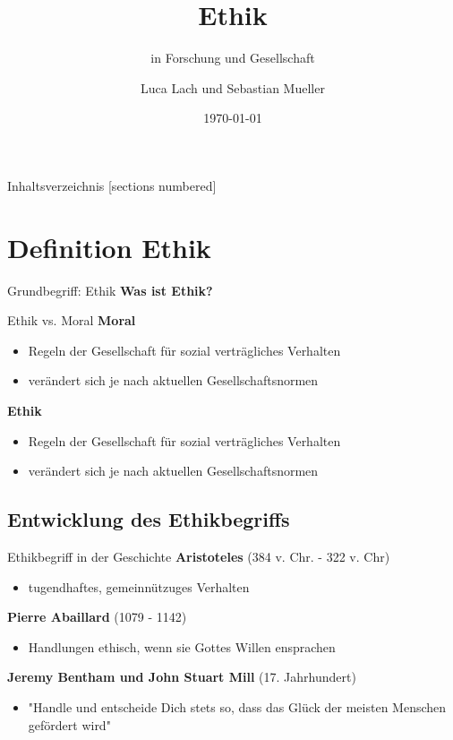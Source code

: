 \documentclass[10pt]{beamer}
\title{Ethik}
\subtitle{in Forschung und Gesellschaft}
\date{\today}
\author{Luca Lach und Sebastian Mueller}
\institute{}
\begin{document}
		
	\maketitle
	
	\begin{frame}{Inhaltsverzeichnis}
		[sections numbered]
		\tableofcontents[hideallsubsections]
	\end{frame}
	
\section{Definition Ethik}
	\begin{frame}{Grundbegriff: Ethik}
		\textbf{Was ist Ethik?}
	\end{frame}
	
	\begin{frame}{Ethik vs. Moral}
		\textbf{Moral}
			\begin{itemize}
				\item Regeln der Gesellschaft für sozial verträgliches Verhalten
				\item verändert sich je nach aktuellen Gesellschaftsnormen
			\end{itemize}
		\textbf{Ethik}
		\begin{itemize}
			\item Regeln der Gesellschaft für sozial verträgliches Verhalten
			\item verändert sich je nach aktuellen Gesellschaftsnormen
		\end{itemize}
			
	\end{frame}
		

	
\subsection{Entwicklung des Ethikbegriffs}
	\begin{frame}{Ethikbegriff in der Geschichte}
		\textbf{Aristoteles} (384 v. Chr. - 322 v. Chr)
		\begin{itemize}
			\item tugendhaftes, gemeinnützuges Verhalten
		\end{itemize}
		
		\textbf{Pierre Abaillard} (1079 - 1142)
		\begin{itemize}
			\item Handlungen ethisch, wenn sie Gottes Willen ensprachen
		\end{itemize}
		
		\textbf{Jeremy Bentham und John Stuart Mill} (17. Jahrhundert)
		\begin{itemize}
			\item "Handle und entscheide Dich stets so, dass das Glück der
			meisten Menschen gefördert wird"
		\end{itemize}
	\end{frame}
	
\end{document}
